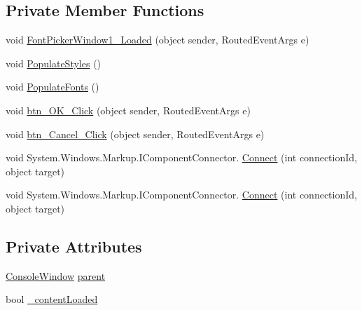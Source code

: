 \subsection*{Private Member Functions}
\begin{DoxyCompactItemize}
\item 
void \hyperlink{class_c_p_u___o_s___simulator_1_1_font_picker_window_a0907f73fb52351e43b76af4137509f41}{Font\+Picker\+Window1\+\_\+\+Loaded} (object sender, Routed\+Event\+Args e)
\item 
void \hyperlink{class_c_p_u___o_s___simulator_1_1_font_picker_window_a79525d7a77c191f63187e5a8181bd197}{Populate\+Styles} ()
\item 
void \hyperlink{class_c_p_u___o_s___simulator_1_1_font_picker_window_a4042c1d9dedbbd9abb956fc7b97c1564}{Populate\+Fonts} ()
\item 
void \hyperlink{class_c_p_u___o_s___simulator_1_1_font_picker_window_a6d659d671c24e1beed969f2d36d669d8}{btn\+\_\+\+O\+K\+\_\+\+Click} (object sender, Routed\+Event\+Args e)
\item 
void \hyperlink{class_c_p_u___o_s___simulator_1_1_font_picker_window_a6e5279d2116523168362cb740eac5e55}{btn\+\_\+\+Cancel\+\_\+\+Click} (object sender, Routed\+Event\+Args e)
\item 
void System.\+Windows.\+Markup.\+I\+Component\+Connector. \hyperlink{class_c_p_u___o_s___simulator_1_1_font_picker_window_ac5f7c5cad6bf2d8dc79c7e59f5a125da}{Connect} (int connection\+Id, object target)
\item 
void System.\+Windows.\+Markup.\+I\+Component\+Connector. \hyperlink{class_c_p_u___o_s___simulator_1_1_font_picker_window_ac5f7c5cad6bf2d8dc79c7e59f5a125da}{Connect} (int connection\+Id, object target)
\end{DoxyCompactItemize}
\subsection*{Private Attributes}
\begin{DoxyCompactItemize}
\item 
\hyperlink{class_c_p_u___o_s___simulator_1_1_console_window}{Console\+Window} \hyperlink{class_c_p_u___o_s___simulator_1_1_font_picker_window_a4e59cc593e060f3229adc8decfeb151c}{parent}
\item 
bool \hyperlink{class_c_p_u___o_s___simulator_1_1_font_picker_window_aa37d57c41c80a6fa875193d68754f658}{\+\_\+content\+Loaded}
\end{DoxyCompactItemize}


